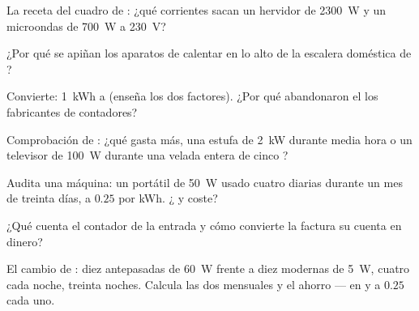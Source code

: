 \begin{exercise}[$\star$]\label{exo:g9:electric-power-energy:3}
La receta del cuadro de : ¿qué corrientes sacan un hervidor de
\qty{2300}{W} y un microondas de \qty{700}{W} a \qty{230}{V}?
\end{exercise}

\begin{exercise}[$\star$]\label{exo:g9:electric-power-energy:4}
¿Por qué se apiñan los aparatos de calentar en lo alto de la escalera
doméstica de ?
\end{exercise}

\begin{exercise}[$\star$]\label{exo:g9:electric-power-energy:5}
Convierte: \qty{1}{kWh} a  (enseña los dos factores). ¿Por
qué abandonaron el  los fabricantes de contadores?
\end{exercise}

\begin{exercise}[$\star$]\label{exo:g9:electric-power-energy:6}
Comprobación de : ¿qué gasta más, una estufa de \qty{2}{kW}
durante media hora o un televisor de \qty{100}{W} durante una velada
entera de cinco ?
\end{exercise}

\begin{exercise}[$\star$]\label{exo:g9:electric-power-energy:7}
Audita una máquina: un portátil de \qty{50}{W} usado cuatro
 diarias durante un mes de treinta días, a $0.25$ por
\unit{kWh}. ¿ y coste?
\end{exercise}

\begin{exercise}[$\star$]\label{exo:g9:electric-power-energy:8}
¿Qué cuenta el contador de la entrada y cómo convierte la factura su
cuenta en dinero?
\end{exercise}

\begin{exercise}[$\star\star$]\label{exo:g9:electric-power-energy:9}
El cambio de : diez antepasadas de \qty{60}{W} frente a
diez modernas de \qty{5}{W}, cuatro  cada noche, treinta
noches. Calcula las dos  mensuales y el ahorro --- en
 y a $0.25$ cada uno.
\end{exercise}

